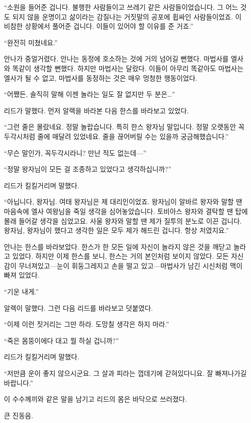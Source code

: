 ``소원을 들어준 겁니다. 불행한 사람들이고 쓰레기 같은 사람들이었습니다. 그 어느 것도 되지 않을 운명이고 삶이라는 감질나는 거짓말의 공포에 휩싸인 사람들이었죠. 이 비참한 상황에서 풀어준 겁니다. 이들이 있어야 할 이유를 준 거죠.''

``완전히 미쳤네요.''

안나가 중얼거렸다. 안나는 동정에 호소하는 것에 거의 넘어길 뻔했다. 마법사를 엘사와 똑같이 생각할 뻔했다. 하지만 마법사는 달랐다. 이들이 아무리 똑같아도 마법사는 엘사가 될 수 없고, 마법사를 동정하는 것은 매우 멍청한 행동이었다.

``어쨌든, 솔직히 말해 이젠 놀라는 일도 잘 없지만 두 분은\ldots''

리드가 말했다. 먼저 알렉을 바라본 다음 한스를 바라보고 있었다.

``그런 줄은 몰랐네요. 정말 놀랍습니다. 특히 한스 왕자님 말입니다. 정말 오랫동안 꼭두각시처럼 줄에 매달려 있었네요. 줄을 끊어버릴 수는 있을까 궁금해했습니다.''

``무슨 말인가, 꼭두각시라니? 만난 적도 없는데—''

``정말 왕자님이 모든 걸 조종하고 있었다고 생각하십니까?''

리드가 킬킬거리며 말했다.

``아닙니다, 왕자님. 여태 왕자님은 제 대리인이었죠. 왕자님이 알바르 왕자와 말할 땐 마음속에 엘사 여왕님을 죽일 생각을 심어놓았습니다. 토비아스 왕자와 결탁할 땐 탑에 몰래 들어갈 생각을 심었고요. 사울 왕자와 말할 땐 제가 질투의 분노로 이끈 겁니다. 왕자님, 왕자님이 했다고 생각한 일은 모두 제가 해드린 겁니다. 항상 저였지요.''

안나는 한스를 바라보았다. 한스가 한 모든 일에 자신이 놀라지 않은 것을 깨닫고 놀라고 있었다. 하지만 이제 한스를 보니, 한스는 거의 본인처럼 보이지 않았다. 모든 자신감이 무너져있고—눈이 휘둥그레지고 손을 떨고 있고—마법사가 남긴 시신처럼 맥이 빠져 있었다.

``기운 내게.''

알렉이 말했다. 그런 다음 리드를 바라보고 덧붙였다.

``이제 이런 짓거리는 그만 하라. 도망칠 생각은 하지 마라.''

``죽은 몸뚱이에다 대고 뭘 하실 겁니까?''

리드가 킬킬거리며 말했다.

``저만큼 운이 좋지 않으시군요. 그 살과 피라는 껍데기에 갇혀있다니요. 잘 빠져나가길 바랍니다.''

이 수수께끼와 같은 말을 남기고 리드의 몸은 바닥으로 쓰러졌다.

큰 진동음.

